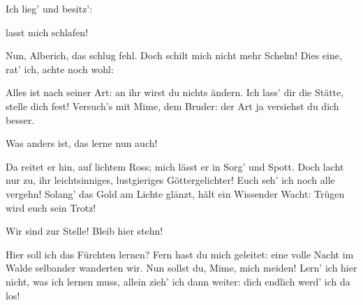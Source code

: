 \begin{drama}
Ich lieg' und besitz':


lasst mich schlafen!

\Wandererspeaks


Nun, Alberich, das schlug fehl.
Doch schilt mich nicht mehr Schelm!
Dies eine, rat' ich,
achte noch wohl:


Alles ist nach seiner Art:
an ihr wirst du nichts ändern.
Ich lass' dir die Stätte,
stelle dich fest!
Versuch's mit Mime, dem Bruder:
der Art ja versiehst du dich besser.


Was anders ist,
das lerne nun auch!


\Alberichspeaks


Da reitet er hin,
auf lichtem Ross;
mich lässt er in Sorg' und Spott.
Doch lacht nur zu,
ihr leichtsinniges,
lustgieriges
Göttergelichter!
Euch seh' ich
noch alle vergehn!
Solang' das Gold
am Lichte glänzt,
hält ein Wissender Wacht:
Trügen wird euch sein Trotz!


\scene


\Mimespeaks

Wir sind zur Stelle!
Bleib hier stehn!

\Siegfriedspeaks


Hier soll ich das Fürchten lernen?
Fern hast du mich geleitet:
eine volle Nacht im Walde
selbander wanderten wir.
Nun sollst du, Mime,
mich meiden!
Lern' ich hier nicht,
was ich lernen muss,
allein zieh' ich dann weiter:
dich endlich werd' ich da los!


\end{drama}
